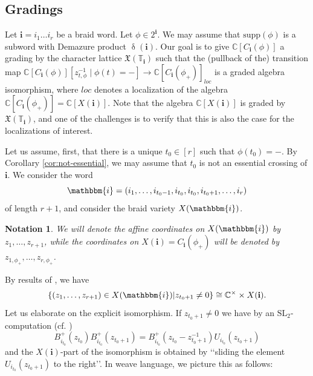 \documentclass[a4paper, 11pt]{amsart}
\newcommand{\charlat}{\mathfrak{X}}
\newcommand{\SL}{\mathrm{SL}}
\newcommand{\supp}{\mathrm{supp}}
\newcommand{\word}[1]{\mathbf{#1}}
\newcommand{\wword}[1]{\mathbbm{#1}}
\DeclareMathOperator{\dem}{\delta}
\newcommand{\C}{\mathbb{C}}
\newcommand{\dil}[1]{\mathbb{T}_{#1}}
\newtheorem{notation}[theorem]{Notation}
\theoremstyle{definition}
\begin{document}
    \subsection{Gradings} Let $\word{i} = i_1\dots i_r$ be a braid word. Let $\phi \in 2^{\word{i}}$. We may assume that $\supp(\phi)$ is a subword with Demazure product $\dem(\word{i})$. Our goal is to give $\C[C_{\word{i}}(\phi)]$ a grading by the character lattice $\charlat(\dil{\word{i}})$ such that the (pullback of the) transition map $\C[C_{\word{i}}(\phi)][z_{t,\phi}^{-1} \mid \phi(t) = -] \to \C[C_{\word{i}}(\phi_{+})]_{loc}$ is a graded algebra isomorphism, where $loc$ denotes a localization of the algebra $\C[C_{\word{i}}(\phi_{+})] = \C[X(\word{i})]$. Note that the algebra $\C[X(\word{i})]$ is graded by $\charlat(\dil{\word{i}})$, and one of the challenges is to verify that this is also the case for the localizations of interest.

Let us assume, first, that there is a unique $t_0 \in [r]$ such that $\phi(t_0) = -$. By Corollary \ref{cor:not-essential}, we may assume that $t_0$ is not an essential crossing of $\word{i}$. 
We consider the word 
\[
\wword{i} = (i_1, \dots, i_{t_0-1}, i_{t_0}, i_{t_0}, i_{t_0+1}, \dots, i_{r})
\]
of length $r+1$, and consider the braid variety $X(\wword{i})$. 

\begin{notation}
We will denote the affine coordinates on $X(\wword{i})$ by $z_1, \dots, z_{r+1}$, while the coordinates on $X(\word{i}) = C_{\word{i}}(\phi_{+})$ will be denoted by $z_{1, \phi_{+}}, \dots, z_{r, \phi_{+}}$.
\end{notation}


By results of \cite[Section 2.3]{CGGS1}, we have
\[
\{(z_1, \dots, z_{r+1}) \in X(\wword{i})| z_{t_0+1} \neq 0 \} \cong \C^{\times} \times X(\word{i}).
\]
Let us elaborate on the explicit isomorphism. If $z_{t_0+1} \neq 0$ we have by an $\SL_2$-computation (cf. \cite[(11)]{CGGLSS})
\[
B^{+}_{i_{t_0}}(z_{t_0})B^{+}_{i_{t_0}}(z_{t_0+1}) = B^{+}_{i_{t_0}}(z_{t_0} - z_{t_0+1}^{-1})U_{i_{t_0}}(z_{t_0+1})
\]
and the $X(\word{i})$-part of the isomorphism is obtained by \lq\lq sliding the element $U_{i_{t_0}}(z_{t_0+1})$ to the right\rq\rq. In weave language, we picture this as follows:
\end{document}
